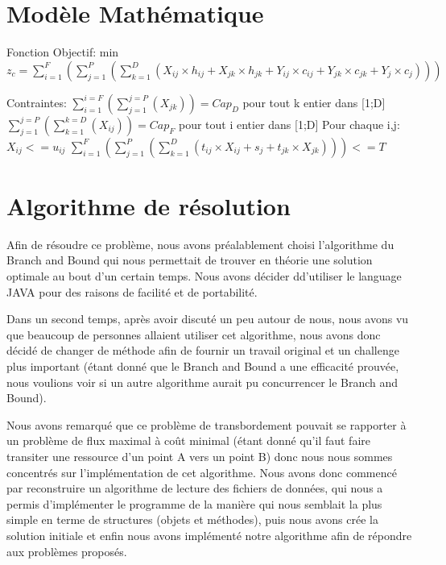 \documentclass[a4paper,10pt]{article}
\begin{document}
\section{Modèle Mathématique}
\hspace{0.5cm}Fonction Objectif:\newline
min $z_{c} = \sum_{i=1}^{F} (\sum_{j=1}^{P} (\sum_{k=1}^{D} (X_{ij} \times h_{ij} + X_{jk} \times
h_{jk} + Y_{ij} \times c_{ij} + Y_{jk} \times c_{jk} + Y_{j} \times c_{j})))$

Contraintes:
\newline$ \sum_{i=1}^{i=F}(\sum_{j=1}^{j=P}(X_{jk})) = Cap_{D}$ pour tout k entier dans [1;D]
\newline$ \sum_{j=1}^{j=P}(\sum_{k=1}^{k=D}(X_{ij})) = Cap_{F}$ pour tout i entier dans [1;D]
\newline Pour chaque i,j: $X_{ij} <= u_{ij}$
\newline $ \sum_{i=1}^{F} (\sum_{j=1}^{P} (\sum_{k=1}^{D} (t_{ij} \times X_{ij} + s_{j} + t_{jk}
\times X_{jk}))) <= T$

\section{Algorithme de résolution}

\hspace{1cm}Afin de résoudre ce problème, nous avons préalablement choisi l'algorithme du Branch and Bound
qui nous permettait de trouver en théorie une solution optimale au bout d'un certain temps.
Nous avons décider dd'utiliser le language JAVA pour des raisons de facilité et de portabilité.\newline

\hspace{0.5cm}Dans un second temps, après avoir discuté un peu autour de nous, nous avons vu que beaucoup de 
personnes allaient utiliser cet algorithme, nous avons donc décidé de changer de méthode afin de 
fournir un travail original et un challenge plus important (étant donné que le Branch and Bound 
a une efficacité prouvée, nous voulions voir si un autre algorithme aurait pu concurrencer le 
Branch and Bound).\newline

\hspace{0.5cm}Nous avons remarqué que ce problème de transbordement pouvait se rapporter à un problème de flux
maximal à coût minimal (étant donné qu'il faut faire transiter une ressource d'un point A vers
un point B) donc nous nous sommes concentrés sur l'implémentation de cet algorithme. Nous avons
donc commencé par reconstruire un algorithme de lecture des fichiers de données, qui nous a permis 
d'implémenter le programme de la manière qui nous semblait la plus simple en terme de structures 
(objets et méthodes), puis nous avons crée la solution initiale et enfin nous avons 
implémenté notre algorithme afin de répondre aux problèmes proposés.
\end{document}
